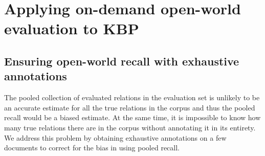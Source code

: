\section{Applying on-demand open-world evaluation to KBP}
\label{sec:application}




\subsection{Ensuring open-world recall with exhaustive annotations}

The pooled collection of evaluated relations in the evaluation set is unlikely to be an accurate estimate for all the true relations in the corpus and thus the pooled recall would be a biased estimate.
At the same time, it is impossible to know how many true relations there are in the corpus without annotating it in its entirety.
We address this problem by obtaining exhaustive annotations on a few documents to correct for the bias in using pooled recall.

